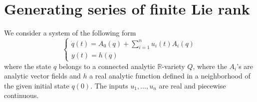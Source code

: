 \documentclass[a4paper,12pt]{article}
\newcommand{\R}{\mathbb{R}}
\begin{document}
\section{Generating series of finite Lie rank}

We consider a system of the following form
\begin{equation} \label{eq:1}
	\begin{cases}
		\dot{q}(t)=A_0(q)+\sum_{i=1}^n u_i(t) A_i(q) \\
		y(t)=h(q)
	\end{cases}
\end{equation}
where the state $q$ belongs to a connected analytic $\R$-variety $Q$, where the $A_i$'s are analytic vector fields and $h$ a real analytic function defined in a neighborhood of the given initial state $q(0)$. The inputs $u_1, \ldots, u_n$ are real and piecewise continuous.
\end{document}
